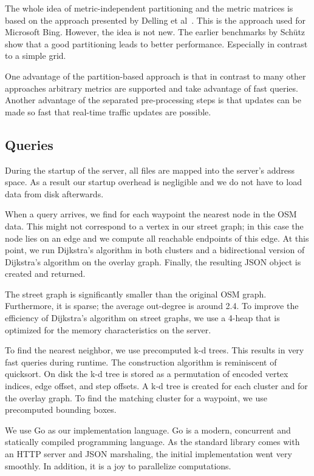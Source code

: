 \documentclass[a4paper]{article}
\begin{document}
The whole idea of metric-independent partitioning and the metric matrices is based
on the approach presented by Delling et al~\cite{del11}.
This is the approach used for Microsoft Bing.
However, the idea is not new. 
The earlier benchmarks by Schütz~\cite{sch04} show that a good partitioning leads
to better performance. Especially in contrast to a simple grid.

One advantage of the partition-based approach is that in contrast to many other 
approaches arbitrary metrics  are supported and take advantage of fast queries.
Another advantage of the separated pre-processing steps is that updates can 
be made so fast that real-time traffic updates are possible. 

\subsection{Queries}

During the startup of the server, all files are mapped into the server's address space.
As a result our startup overhead is negligible and we do not have to load data from disk afterwards.

When a query arrives, we find for each waypoint the nearest node in the OSM data.
This might not correspond to a vertex in our street graph;
in this case the node lies on an edge and we compute all reachable endpoints of this edge.
At this point, we run Dijkstra's algorithm in both clusters and
a bidirectional version of Dijkstra's algorithm on the overlay graph.
Finally, the resulting JSON object is created and returned.

The street graph is significantly smaller than the original OSM graph.
Furthermore, it is sparse; the average out-degree is around 2.4.
To improve the efficiency of Dijkstra's algorithm on street graphs, we use a 4-heap
that is optimized for the memory characteristics on the server.

To find the nearest neighbor, we use precomputed k-d trees.
This results in very fast queries during runtime.
The construction algorithm is reminiscent of quicksort.
On disk the k-d tree is stored as a permutation of encoded vertex indices, edge offset, and step offsets.
A k-d tree is created for each cluster and for the overlay graph.
To find the matching cluster for a waypoint, we use precomputed bounding boxes.

We use Go as our implementation language.
Go is a modern, concurrent and statically compiled programming language.
As the standard library comes with an HTTP server and JSON marshaling,
the initial implementation went very smoothly.
In addition, it is a joy to parallelize computations.
\end{document}
